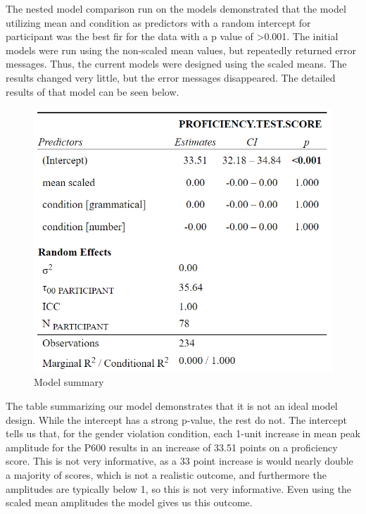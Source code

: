 \documentclass[
  man,floatsintext]{apa6}
\begin{document}
The nested model comparison run on the models demonstrated that the model utilizing mean and condition as predictors with a random intercept for participant was the best fir for the data with a p value of \textgreater0.001. The initial models were run using the non-scaled mean values, but repeatedly returned error messages. Thus, the current models were designed using the scaled means. The results changed very little, but the error messages disappeared. The detailed results of that model can be seen below.

\begin{figure}[H]
\includegraphics[width=\linewidth]{figs/mod_tab} \caption{Model summary}\label{fig:fig-mod-tab}
\end{figure}

The table summarizing our model demonstrates that it is not an ideal model design. While the intercept has a strong p-value, the rest do not. The intercept tells us that, for the gender violation condition, each 1-unit increase in mean peak amplitude for the P600 results in an increase of 33.51 points on a proficiency score. This is not very informative, as a 33 point increase is would nearly double a majority of scores, which is not a realistic outcome, and furthermore the amplitudes are typically below 1, so this is not very informative. Even using the scaled mean amplitudes the model gives us this outcome.
\end{document}
